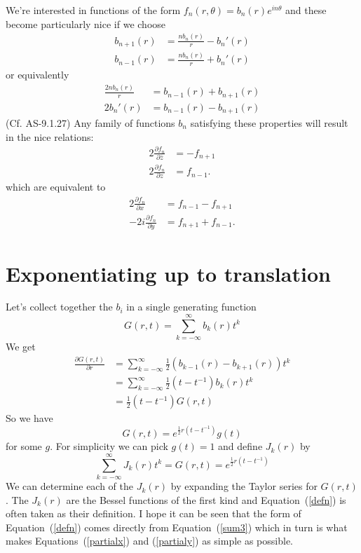 \documentclass{article}
\begin{document}
We're interested in functions of the form
$f_n(r,\theta)=b_n(r)e^{in\theta}$
and these become particularly nice if we choose
\begin{align*}
b_{n+1}(r) & = \frac{nb_n(r)}{r}-b_n'(r) \\
b_{n-1}(r) & = \frac{nb_n(r)}{r}+b_n'(r)
\end{align*}
or equivalently
\begin{align}
\frac{2nb_n(r)}{r} & =  b_{n-1}(r)+b_{n+1}(r) \label{sum} \\
2b_n'(r) & =  b_{n-1}(r)-b_{n+1}(r) \label{deriv}
\end{align}
(Cf. AS-9.1.27)
Any family of functions $b_n$ satisfying these properties will result in the nice relations:
\begin{align*}
2\frac{\partial f_n}{\partial\bar{z}} & = -f_{n+1} \\
2\frac{\partial f_n}{\partial z} & = f_{n-1}.
\end{align*}
which are equivalent to
\begin{align}
2\frac{\partial f_n}{\partial x} & = f_{n-1}-f_{n+1} \label{sum3} \\
-2i\frac{\partial f_n}{\partial y} & = f_{n+1}+f_{n-1} \label{sum4}.
\end{align}

\section{Exponentiating up to translation}
Let's collect together the $b_i$ in a single generating function
\[
G(r,t) = \sum_{k=-\infty}^\infty b_k(r)t^k
\]
We get
\begin{align*}
\frac{\partial G(r,t)}{\partial r} &= \sum_{k=-\infty}^\infty \frac{1}{2}(b_{k-1}(r)-b_{k+1}(r))t^k\\
&= \sum_{k=-\infty}^\infty \frac{1}{2}(t-t^{-1})b_k(r)t^k \\
&= \frac{1}{2}(t-t^{-1})G(r,t)
\end{align*}
So we have
\[
G(r,t) = e^{\frac{1}{2}r(t-t^{-1})}g(t)
\]
for some $g$.
For simplicity we can pick $g(t) = 1$ and define $J_k(r)$ by
\begin{equation}
\boxed{\sum_{k=-\infty}^\infty J_k(r)t^k = G(r,t) = e^{\frac{1}{2}r(t-t^{-1})}}\label{defn}
\end{equation}
We can determine each of the $J_k(r)$ by expanding the Taylor series for $G(r, t)$.
The $J_k(r)$ are the Bessel functions of the first kind and Equation~(\ref{defn}) is often taken as their definition.
I hope it can be seen that the form of Equation~(\ref{defn}) comes directly from Equation~(\ref{sum3}) which in turn is what makes Equations~(\ref{partialx}) and (\ref{partialy}) as simple as possible.
\end{document}
